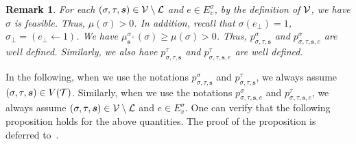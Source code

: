 \documentclass[11pt]{article}
\newtheorem*{remark}{Remark}
\newcommand{\seqS}{\boldsymbol{s}}
\begin{document}
\begin{remark}
\emph{
For each $(\sigma, \tau, \seqS) \in \+V\setminus \+L$ and $e\in E_{v}^{\sigma}$, by the definition of $\mathcal{V}$, we have $\sigma$ is feasible. Thus, $\mu(\sigma)>0$.
In addition, recall that $\sigma(e_{\bot}) = 1$, $\sigma_{\bot} = (e_{\bot}\leftarrow 1)$.
We have  
$\mu^{\sigma_{\bot}}_{\seqS}(\sigma) \geq \mu(\sigma)>0$.
Thus, $p^{\sigma}_{\sigma, \tau, \seqS}$ and $p^{\sigma}_{\sigma, \tau, \seqS,e}$
are well defined.
Similarly, we also have $p^{\tau}_{\sigma, \tau, \seqS}$ and $p^{\tau}_{\sigma, \tau, \seqS, e}$ are well defined.
}
\end{remark}


In the following, when we use the notations $p^{\sigma}_{\sigma, \tau, \seqS}$ and $p^{\tau}_{\sigma, \tau, \seqS}$,
we always assume  $(\sigma,\tau,\seqS)\in V(\+T)$.
Similarly, when we use the notations $p^{\sigma}_{\sigma, \tau, \seqS, e}$ and $p^{\tau}_{\sigma, \tau, \seqS, e}$, we always assume  $(\sigma,\tau,\seqS)\in \+V \setminus \+L$ and $e\in E_{v}^{\sigma}$.
One can verify that the following proposition holds for the above quantities. The proof of the proposition is deferred to~.
\end{document}
